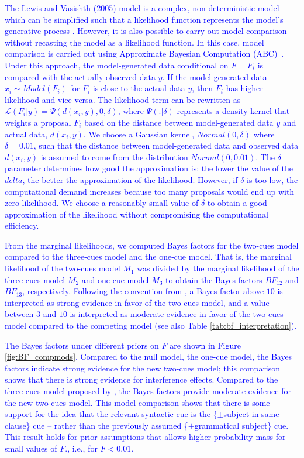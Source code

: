 \documentclass[a4paper, man, floatsintext]{apa7}
\begin{document}
{\textcolor{blue}{The Lewis and Vasishth (2005) model is a complex, non-deterministic model which can be simplified such that a likelihood function represents the model's generative process  \parencite[e.g., in][]{NicenboimRetrieval2018,lisson2020computational}. However, it is also possible to carry out model comparison without recasting the model as a likelihood function. In this case, model comparison is carried out using Approximate Bayesian Computation (ABC)~\citep{sisson2018handbook,palestro2018likelihood}. Under this approach, the model-generated data conditional on $F=F_i$ is compared with the actually observed data $y$. If the model-generated data $x_{i} \sim Model(F_i)$ for $F_i$ is close to the actual data $y$, then $F_i$ has higher likelihood and vice versa. The likelihood term can be rewritten as $\mathcal{L}(F_i|y) = \Psi(d(x_i, y), 0 , \delta)$, where $\Psi(.|\delta)$ represents a density kernel that weights a proposal $F_i$ based on the distance between model-generated data $y$ and actual data, $d(x_i,y)$. We choose a Gaussian kernel, $Normal(0,\delta)$ where $\delta=0.01$, such that the distance between model-generated data and observed data $d(x_i,y)$ is assumed to come from the distribution $Normal(0,0.01)$. The $\delta$ parameter determines how good the approximation is: the lower the value of the $delta$, the better the approximation of the likelihood. However, if $\delta$ is too low, the computational demand increases because too many proposals would end up with zero likelihood. We choose a reasonably small value of $\delta$ to obtain a good approximation of the likelihood without compromising the computational efficiency.}

\textcolor{blue}{From the marginal likelihoods, we computed Bayes factors for the two-cues model compared to the three-cues model and the one-cue model. That is, the marginal likelihood of the two-cues model $M_1$ was divided by the marginal likelihood of the three-cues model $M_2$ and one-cue model $M_3$ to obtain the Bayes factors $BF_{12}$ and $BF_{13}$, respectively. Following the convention from \textcite{jeffreys1998theory}, a Bayes factor above $10$ is interpreted as strong evidence in favor of the two-cues model, and a value between $3$ and $10$ is interpreted as moderate evidence in favor of the two-cues model compared to the competing model (see also Table \ref{tab:bf_interpretation}).}

\textcolor{blue}{The Bayes factors under different priors on $F$ are shown in Figure \ref{fig:BF_compmods}. Compared to the null model, the one-cue model, the Bayes factors indicate strong evidence for the new two-cues model; this comparison shows that there is strong evidence for interference effects. Compared to the three-cues model proposed by \textcite{mertzen}, the Bayes factors provide moderate evidence for the new two-cues model. This model comparison shows that there is some support for the idea that the relevant syntactic cue is the \{$\pm$subject-in-same-clause\} cue – rather than the previously assumed \{$\pm$grammatical subject\} cue. This result holds for prior assumptions that allows higher probability mass for small values of $F$., i.e., for $F<0.01$.}

}
\end{document}
